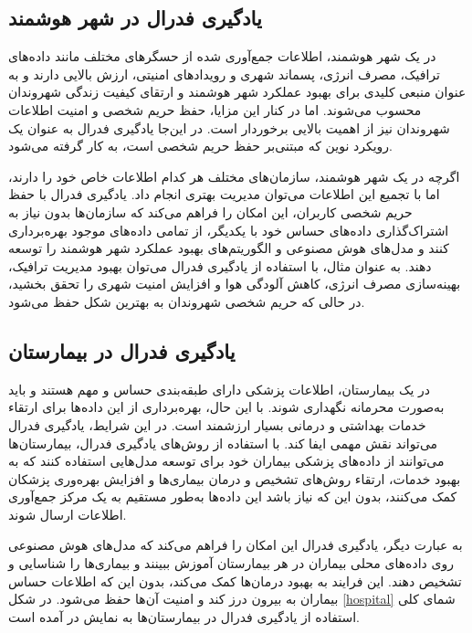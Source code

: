 \subsection{
	یادگیری فدرال در شهر هوشمند%
}
در یک شهر هوشمند، اطلاعات جمع‌آوری شده از حسگرهای مختلف مانند داده‌های ترافیک، مصرف انرژی، پسماند شهری و رویدادهای امنیتی، ارزش بالایی دارند و به عنوان منبعی کلیدی برای بهبود عملکرد شهر هوشمند و ارتقای کیفیت زندگی شهروندان محسوب می‌شوند. اما در کنار این مزایا، حفظ حریم شخصی و امنیت اطلاعات شهروندان نیز از اهمیت بالایی برخوردار است. در این‌جا یادگیری فدرال به عنوان یک رویکرد نوین که مبتنی‌بر حفظ حریم شخصی است، به کار گرفته می‌شود.

اگرچه در یک شهر هوشمند، سازمان‌های مختلف هر کدام اطلاعات خاص خود را دارند، اما با تجمیع این اطلاعات می‌توان مدیریت بهتری انجام داد. یادگیری فدرال با حفظ حریم شخصی کاربران، این امکان را فراهم می‌کند که سازمان‌ها بدون نیاز به اشتراک‌گذاری داده‌های حساس خود با یکدیگر، از تمامی داده‌های موجود بهره‌برداری کنند و مدل‌های هوش مصنوعی و الگوریتم‌های بهبود عملکرد شهر هوشمند را توسعه دهند. به عنوان مثال، با استفاده از یادگیری فدرال می‌توان بهبود مدیریت ترافیک، بهینه‌سازی مصرف انرژی، کاهش آلودگی هوا و افزایش امنیت شهری را تحقق بخشید، در حالی که حریم شخصی شهروندان به بهترین شکل حفظ می‌شود.


\subsection{یادگیری فدرال در بیمارستان}
در یک بیمارستان، اطلاعات پزشکی دارای طبقه‌بندی حساس و مهم هستند و باید به‌صورت محرمانه نگهداری شوند. با این حال، بهره‌برداری از این داده‌ها برای ارتقاء خدمات بهداشتی و درمانی بسیار ارزشمند است. در این شرایط، یادگیری فدرال می‌تواند نقش مهمی ایفا کند. با استفاده از روش‌های یادگیری فدرال، بیمارستان‌ها می‌توانند از داده‌های پزشکی بیماران خود برای توسعه مدل‌هایی استفاده کنند که به بهبود خدمات، ارتقاء روش‌های تشخیص و درمان بیماری‌ها و افزایش بهره‌وری پزشکان کمک می‌کنند، بدون این که نیاز باشد این داده‌ها به‌طور مستقیم به یک مرکز جمع‌آوری اطلاعات ارسال شوند.

به عبارت دیگر، یادگیری فدرال این امکان را فراهم می‌کند که مدل‌های هوش مصنوعی روی داده‌های محلی بیماران در هر بیمارستان آموزش ببینند و بیماری‌ها را شناسایی و تشخیص دهند. این فرایند به بهبود درمان‌ها کمک می‌کند، بدون این که اطلاعات حساس بیماران به بیرون درز کند و امنیت آن‌ها حفظ می‌شود. در شکل
\ref{hospital}
شمای کلی استفاده از یادگیری فدرال در بیمارستان‌ها به نمایش در آمده است.


